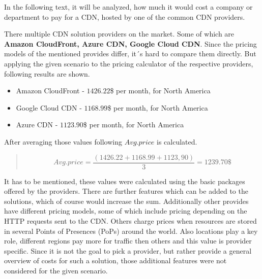 In the following text, it will be analyzed, how much it would cost a company or department to pay for a CDN, hosted by one of the common CDN providers. 

There multiple CDN solution providers on the market. Some of which are \textbf{Amazon CloudFront, Azure CDN, Google Cloud CDN}. \cite{top_10_cdn}
Since the pricing models of the mentioned provides differ, it´s hard to compare them directly. But applying the given scenario to the pricing calculator of the respective providers, following results are shown.

\begin{itemize}[noitemsep]
	\item Amazon CloudFront - $1426.22$\$ per month, for North America
	\item Google Cloud CDN - $1168.99$\$ per month, for North America
	\item Azure CDN - $1123.90$\$ per month, for North America
\end{itemize} 

After averaging those values following $Avg. price$ is calculated.  

\begin{quote}
	\begin{center}
		\begin{equation*}
			Avg. price = 
			\frac{
				\left(1426.22 + 1168.99 + 1123,90\right)
			}{
				3
			} = 1239.70  \$
		\end{equation*}
	\end{center} 
\end{quote}

It has to be mentioned, these values were calculated using the basic packages offered by the providers. There are further features which can be added to the solutions, which of course would increase the sum. Additionally other provides have different pricing models, some of which include pricing depending on the HTTP requests sent to the CDN. Others charge prices when resources are stored in several Points of Presences (PoPs) around the world. Also locations play a key role, different regions pay more for traffic then others and this value is provider specific.
Since it is not the goal to pick a provider, but rather provide a general overview of costs for such a solution, those additional features were not considered for the given scenario.



